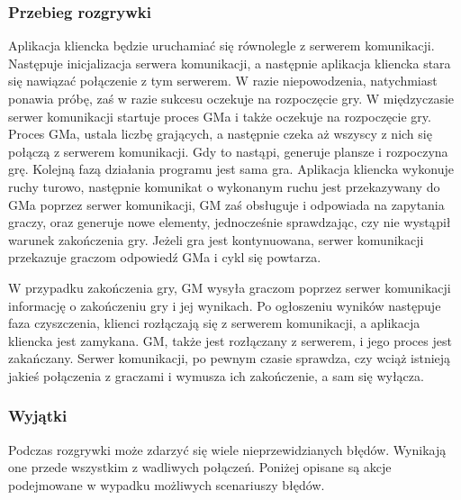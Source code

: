 \documentclass[11pt]{article}
\let\Oldsubsubsection\subsubsection
\renewcommand{\subsubsection}{\FloatBarrier\Oldsubsubsection}
\begin{document}
\subsubsection{Przebieg rozgrywki}
\par
Aplikacja kliencka będzie uruchamiać się równolegle z serwerem komunikacji. Następuje inicjalizacja serwera komunikacji, a następnie aplikacja kliencka stara się nawiązać połączenie z tym serwerem. W razie niepowodzenia, natychmiast ponawia próbę, zaś w razie sukcesu oczekuje na rozpoczęcie gry. W międzyczasie serwer komunikacji startuje proces GMa i także oczekuje na rozpoczęcie gry. Proces GMa, ustala liczbę grających, a następnie czeka aż wszyscy z nich się połączą z serwerem komunikacji. Gdy to nastąpi, generuje plansze i rozpoczyna grę. Kolejną fazą działania programu jest sama gra. Aplikacja kliencka wykonuje ruchy turowo, następnie komunikat o wykonanym ruchu jest przekazywany do GMa poprzez serwer komunikacji, GM zaś obsługuje i odpowiada na zapytania graczy, oraz generuje nowe elementy, jednocześnie sprawdzając, czy nie wystąpił warunek zakończenia gry. Jeżeli gra jest kontynuowana, serwer komunikacji przekazuje graczom odpowiedź GMa i cykl się powtarza.
\par
W przypadku zakończenia gry, GM wysyła graczom poprzez serwer komunikacji informację o zakończeniu gry i jej wynikach. Po ogłoszeniu wyników następuje faza czyszczenia, klienci rozłączają się z serwerem komunikacji, a aplikacja kliencka jest zamykana. GM, także jest rozłączany z serwerem, i jego proces jest zakańczany. Serwer komunikacji, po pewnym czasie sprawdza, czy wciąż istnieją jakieś połączenia z graczami i wymusza ich zakończenie, a sam się wyłącza.



\subsubsection{Wyjątki}
\par
Podczas rozgrywki może zdarzyć się wiele nieprzewidzianych błędów. Wynikają one przede wszystkim z wadliwych połączeń. Poniżej opisane są akcje podejmowane w wypadku możliwych scenariuszy błędów.
\end{document}
